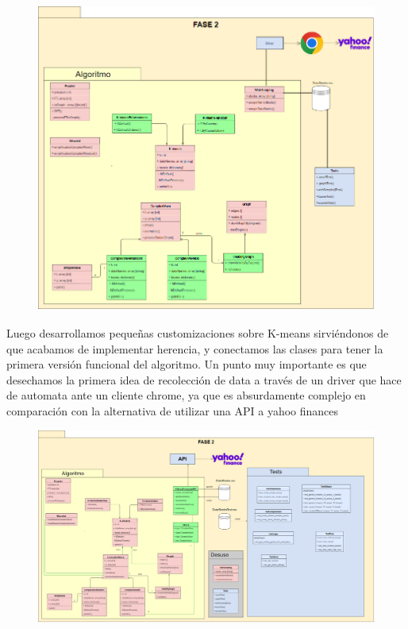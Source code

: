 \documentclass[12pt,a4paper]{article}
\begin{document}
\begin{figure}[H]
\centering
  \centering
  \includegraphics[width=1\linewidth]{fase 2 herencia}
\label{fig:subrgrafo}
\end{figure}
	Luego desarrollamos pequeñas customizaciones sobre K-means sirviéndonos de que acabamos de implementar herencia, y conectamos las clases para tener la primera versión funcional del algoritmo. Un punto muy importante es que desechamos la primera idea de recolección de data a través de un driver que hace de automata ante un cliente chrome, ya que es absurdamente complejo en comparación con la alternativa de utilizar una API a yahoo finances\\
\begin{figure}[H]
\centering
  \centering
  \includegraphics[width=1\linewidth]{fase 2 conexiones}
\label{fig:subrgrafo}
\end{figure}
\end{document}
